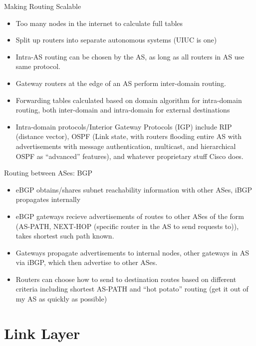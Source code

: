 \documentclass{beamer}
\begin{document}
\begin{frame}[t]{Making Routing Scalable}
    \begin{itemize}
        \item Too many nodes in the internet to calculate full tables
        \pause\item Split up routers into separate \alert{autonomous systems} (UIUC is one)
        \pause\item Intra-AS routing can be chosen by the AS, as long as all routers in AS use same protocol.
        \pause\item \alert{Gateway routers} at the edge of an AS perform inter-domain routing.
        \pause\item Forwarding tables calculated based on domain algorithm for intra-domain routing, both inter-domain and intra-domain for external destinations
        \pause\item Intra-domain protocols/\alert{Interior Gateway Protocols} (IGP) include \alert{RIP} (distance vector), \alert{OSPF} (Link state, with routers flooding entire AS with advertisements with message authentication, multicast, and hierarchical OSPF as ``advanced'' features), and whatever proprietary stuff Cisco does.
    \end{itemize}
\end{frame}

\begin{frame}[t]{Routing between ASes: BGP}
    \begin{itemize}
        \item \alert{eBGP} obtains/shares subnet reachability information with other ASes, \alert{iBGP} propagates internally
        \pause\item eBGP gateways recieve advertisements of routes to other ASes of the form (AS-PATH, NEXT-HOP (specific router in the AS to send requests to)), takes shortest such path known.
        \pause\item Gateways propagate advertisements to internal nodes, other gateways in AS via iBGP, which then advertise to other ASes.
        \pause\item Routers can choose how to send to destination routes based on different criteria including shortest AS-PATH and ``hot potato'' routing (get it out of my AS as quickly as possible)
    \end{itemize}
\end{frame}

\section{Link Layer}
\end{document}
